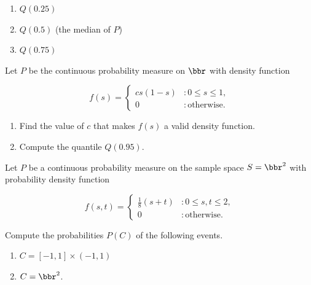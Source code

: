 \documentclass[12pt,reqno]{amsart}
\begin{document}
\medskip
\begin{enumerate}
    \item $Q(0.25)$\vfill
    


    \item $Q(0.5)$ (the median of $P$)\vfill
    

    \item $Q(0.75)$\vfill

\end{enumerate}












\prob Let $P$ be the continuous probability measure on $\bbr$ with density function

    \[f(s) = \begin{cases}
        cs(1-s) & : 0 \leq s \leq 1, \\
        0 & : \text{otherwise}.
    \end{cases}\]


\medskip
\begin{enumerate}
    \item Find the value of $c$ that makes $f(s)$ a valid density function.\vfill
    


    \item Compute the quantile $Q(0.95)$.\vfill
    

\end{enumerate}












\newpage
\prob Let $P$ be a continuous probability measure on the sample space $S=\bbr^2$ with probability density function

\[f(s,t) = \begin{cases}
\frac{1}{8}(s+t) & : 0\leq s,t \leq 2, \\
0 & : \text{otherwise}.    
\end{cases}\]

Compute the probabilities $P(C)$ of the following events.

\medskip
\begin{enumerate}
\item $C=[-1,1] \times (-1,1)$\vfill


\item $C = \bbr^2$.\vfill


\end{enumerate}
\end{document}

